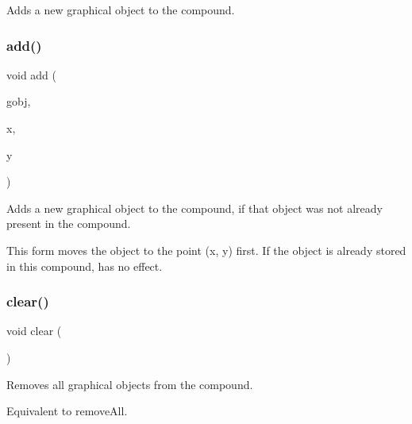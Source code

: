 Adds a new graphical object to the compound. 

\mbox{\label{classsgl_1_1GCompound_a5b11b532869632a6c26b098b0858eac5}} 
\subsubsection{\texorpdfstring{add()}{add()}\hspace{0.1cm}{\footnotesize\ttfamily [4/4]}}
{\footnotesize\ttfamily void add (\begin{DoxyParamCaption}\item[{\mbox{\hyperlink{classsgl_1_1GObject}{G\+Object}} \&}]{gobj,  }\item[{double}]{x,  }\item[{double}]{y }\end{DoxyParamCaption})\hspace{0.3cm}{\ttfamily [virtual]}}



Adds a new graphical object to the compound, if that object was not already present in the compound. 

This form moves the object to the point ({\ttfamily x}, {\ttfamily y}) first. If the object is already stored in this compound, has no effect. \mbox{\label{classsgl_1_1GCompound_ac8bb3912a3ce86b15842e79d0b421204}} 
\subsubsection{\texorpdfstring{clear()}{clear()}}
{\footnotesize\ttfamily void clear (\begin{DoxyParamCaption}{ }\end{DoxyParamCaption})\hspace{0.3cm}{\ttfamily [virtual]}}



Removes all graphical objects from the compound. 

Equivalent to remove\+All. \mbox{\label{classsgl_1_1GCompound_a221b3e75bb3d9d0bfea62b3364e6773b}} 

